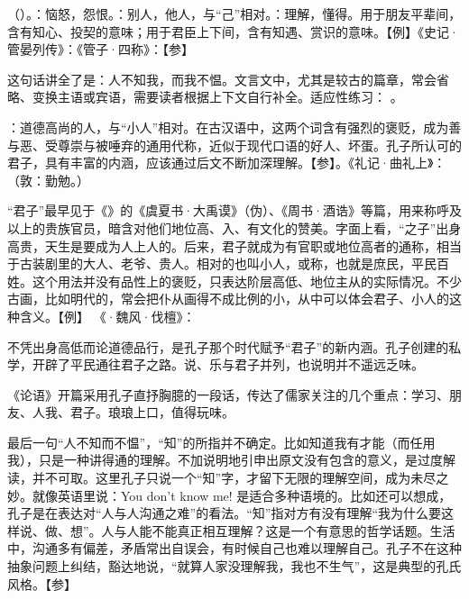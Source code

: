 {\item {}（）。：恼怒，怨恨。：别人，他人，与“己”相对。：理解，懂得。用于朋友平辈间，含有知心、投契的意味；用于君臣上下间，含有知遇、赏识的意味。【例】《史记·管晏列传》：《管子·四称》：【参】

这句话讲全了是：人不知我，而我不愠。文言文中，尤其是较古的篇章，常会省略、变换主语或宾语，需要读者根据上下文自行补全。适应性练习：   。

\item {}：道德高尚的人，与“小人”相对。在古汉语中，这两个词含有强烈的褒贬，成为善与恶、受尊崇与被唾弃的通用代称，近似于现代口语的好人、坏蛋。孔子所认可的君子，具有丰富的内涵，应该通过后文不断加深理解。【参】。《礼记·曲礼上》：（敦：勤勉。）

“君子”最早见于《》的《虞夏书·大禹谟》（伪）、《周书·酒诰》等篇，用来称呼及以上的贵族官员，暗含对他们地位高、入、有文化的赞美。字面上看，“之子”出身高贵，天生是要成为人上人的。后来，君子就成为有官职或地位高者的通称，相当于古装剧里的大人、老爷、贵人。相对的也叫小人，或称，也就是庶民，平民百姓。这个用法并没有品性上的褒贬，只表达阶层高低、地位主从的实际情况。不少古画，比如明代的，常会把仆从画得不成比例的小，从中可以体会君子、小人的这种含义。【例】 《·魏风·伐檀》：

不凭出身高低而论道德品行，是孔子那个时代赋予“君子”的新内涵。孔子创建的私学，开辟了平民通往君子之路。说、乐与君子并列，也说明并不遥远乏味。
}
{
《论语》开篇采用孔子直抒胸臆的一段话，传达了儒家关注的几个重点：学习、朋友、人我、君子。琅琅上口，值得玩味。

最后一句“人不知而不愠”，“知”的所指并不确定。比如知道我有才能（而任用我），只是一种讲得通的理解。不加说明地引申出原文没有包含的意义，是过度解读，并不可取。这里孔子只说一个“知”字，才留下无限的理解空间，成为未尽之妙。就像英语里说：You don't know me! 是适合多种语境的。比如还可以想成，孔子是在表达对“人与人沟通之难”的看法。“知”指对方有没有理解“我为什么要这样说、做、想”。人与人能不能真正相互理解？这是一个有意思的哲学话题。生活中，沟通多有偏差，矛盾常出自误会，有时候自己也难以理解自己。孔子不在这种抽象问题上纠结，豁达地说，“就算人家没理解我，我也不生气”，这是典型的孔氏风格。【参】 
}

